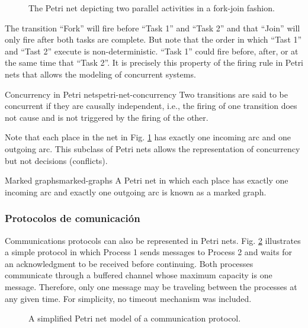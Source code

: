 \begin{figure}[!htb]
      \centering
      
      \caption{The Petri net depicting two parallel activities in a fork-join fashion.}
      \label{fig:parallel-activities-example}
\end{figure}

The transition ``Fork'' will fire before ``Task 1'' and ``Task 2''
and that ``Join'' will only fire after both tasks are complete.
But note that the order in which ``Tast 1'' and ``Tast 2'' execute is non-deterministic.
``Task 1'' could fire before, after, or at the same time that ``Task 2''.
It is precisely this property of the firing rule in Petri nets
that allows the modeling of concurrent systems.

\begin{definition}{Concurrency in Petri nets}{petri-net-concurrency}
      Two transitions are said to be concurrent if they are causally independent, i.e.,
      the firing of one transition does not cause and is not triggered by the firing of the other.
\end{definition}

Note that each place in the net in Fig. \ref{fig:parallel-activities-example}
has exactly one incoming arc and one outgoing arc.
This subclass of Petri nets allows the representation of concurrency but not decisions (conflicts).

\begin{definition}{Marked graphs}{marked-graphs}
      A Petri net in which each place has exactly one incoming arc
      and exactly one outgoing arc is known as a marked graph.
\end{definition}

\subsubsection{Protocolos de comunicación}

Communications protocols can also be represented in Petri nets.
Fig. \ref{fig:communication-protocols-example} illustrates a simple protocol
in which Process 1 sends messages to Process 2 and
waits for an acknowledgment to be received before continuing.
Both processes communicate through a buffered channel whose maximum capacity is one message.
Therefore, only one message may be traveling between the processes at any given time.
For simplicity, no timeout mechanism was included.

\begin{figure}[!htbp]
      \centering
      
      \caption{A simplified Petri net model of a communication protocol.}
      \label{fig:communication-protocols-example}
\end{figure}

